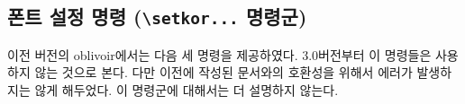 \documentclass[
	12pt,
	a4paper,
	kosection,
	footnote,
	microtype,
	figtabcapt,
]{oblivoir}
\def\cs#1{\texttt{\textbackslash #1}}
\begin{document}

\subsection{폰트 설정 명령 (\protect\cs{setkor...} 명령군)}

이전 버전의 oblivoir에서는 다음 세 명령을 제공하였다. 3.0버전부터 이 명령들은
사용하지 않는 것으로 본다. 다만 이전에 작성된 문서와의 호환성을 위해서 에러가 발생하지는
않게 해두었다.
이 명령군에 대해서는 더 설명하지 않는다.
\end{document}

